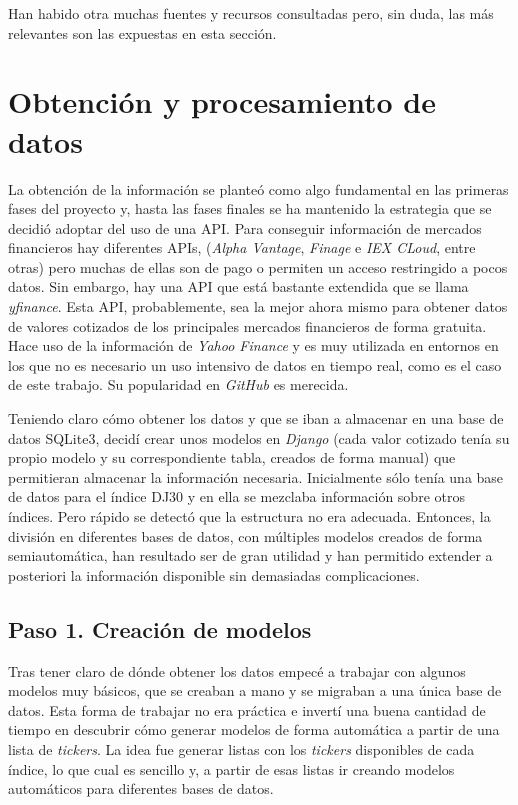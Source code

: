 Han habido otra muchas fuentes y recursos consultadas pero, sin duda, las más relevantes son las expuestas en esta sección. 


\section{Obtención y procesamiento de datos}\label{procesado_de_datos}

La obtención de la información se planteó como algo fundamental en las primeras fases del proyecto y, hasta las fases finales se ha mantenido la estrategia que se decidió adoptar del uso de una API. Para conseguir información de mercados financieros hay diferentes APIs, (\emph{Alpha Vantage}, \emph{Finage} e \emph{IEX CLoud}, entre otras) pero muchas de ellas son de pago o permiten un acceso restringido a pocos datos. Sin embargo, hay una API que está bastante extendida que se llama \emph{yfinance}\citep{online:yfinance}. Esta API, probablemente, sea la mejor ahora mismo para obtener datos de valores cotizados de los principales mercados financieros de forma gratuita. Hace uso de la información de \emph{Yahoo Finance} y es muy utilizada en entornos en los que no es necesario un uso intensivo de datos en tiempo real, como es el caso de este trabajo. Su popularidad en \emph{GitHub} es merecida\citep{online:yfinance_github}.

Teniendo claro cómo obtener los datos y que se iban a almacenar en una base de datos SQLite3, decidí crear unos modelos en \emph{Django} (cada valor cotizado tenía su propio modelo y su correspondiente tabla, creados de forma manual) que permitieran almacenar la información necesaria. Inicialmente sólo tenía una base de datos para el índice DJ30 y en ella se mezclaba información sobre otros índices. Pero rápido se detectó que la estructura no era adecuada. Entonces, la división en diferentes bases de datos, con múltiples modelos creados de forma semiautomática, han resultado ser de gran utilidad y han permitido extender a posteriori la información disponible sin demasiadas complicaciones. 

\subsection{Paso 1. Creación de modelos}

Tras tener claro de dónde obtener los datos empecé a trabajar con algunos modelos muy básicos, que se creaban a mano y se migraban a una única base de datos. Esta forma de trabajar no era práctica e invertí una buena cantidad de tiempo en descubrir cómo generar modelos de forma automática a partir de una lista de \emph{tickers}. La idea fue generar listas con los \emph{tickers} disponibles de cada índice, lo que cual es sencillo y, a partir de esas listas ir creando modelos automáticos para diferentes bases de datos. 

